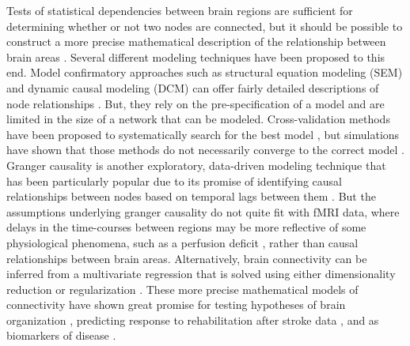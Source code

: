 \documentclass{bmcart}
\begin{document}
Tests of statistical dependencies between brain regions are sufficient for determining whether or not two nodes are connected, but it should be possible to construct a more precise mathematical description of the relationship between brain areas \cite{Friston1994}. Several different modeling techniques have been proposed to this end. Model confirmatory approaches such as structural equation modeling (SEM) \cite{Buchel1997} and dynamic causal modeling (DCM) \cite{Friston2003} can offer fairly detailed descriptions of node relationships . But, they rely on the pre-specification of a model and are limited in the size of a network that can be modeled. Cross-validation methods have been proposed to systematically search for the best model \cite{Zhuang2005,Penny2010,James2009}, but simulations have shown that those methods do not necessarily converge to the correct model \cite{Lohmann2012}. Granger causality is another exploratory, data-driven modeling technique that has been particularly popular due to its promise of identifying causal relationships between nodes based on temporal lags between them \cite{Deshpande2011}. But the assumptions underlying granger causality do not quite fit with fMRI data\cite{Smith2011}, where delays in the time-courses between regions may be more reflective of some physiological phenomena, such as a perfusion deficit \cite{Lv2013}, rather than causal relationships between brain areas. Alternatively, brain connectivity can be inferred from a multivariate regression  that is solved using either dimensionality reduction \cite{Friston1994} or regularization \cite{Craddock2013b}. These more precise mathematical models of connectivity have shown great promise for testing hypotheses of brain organization \cite{Craddock2013b}, predicting response to rehabilitation after stroke data \cite{James2009b}, and as biomarkers of disease \cite{Brodersen2011}.
\end{document}
